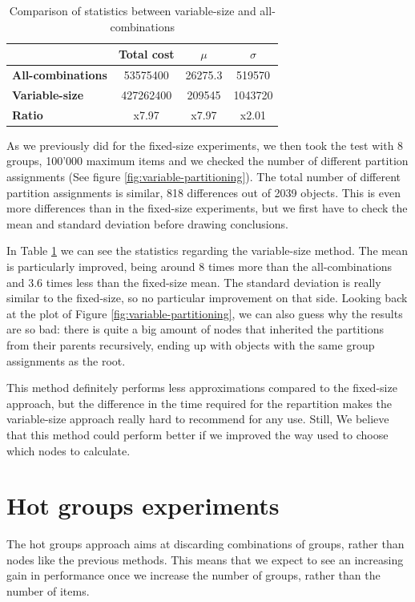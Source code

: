 \begin{table}[!htb]
  \centering
  \begin{tabular}{l c c c}
    \hline
    & \textbf{Total cost} & \textbf{$\mu$} & \textbf{$\sigma$} \\
    \hline
    \textbf{All-combinations} & 53575400 & 26275.3 & 519570\\
    \textbf{Variable-size} & 427262400 & 209545 & 1043720 \\
    \hline
    \textbf{Ratio} & x7.97 & x7.97 & x2.01 \\
    \hline
  \end{tabular}
  \caption{Comparison of statistics between variable-size and all-combinations}\label{tab:mean-stddev-variable-all}
\end{table}

As we previously did for the fixed-size experiments, we then took the test with 8 groups, 100'000 maximum items and we checked the number of different partition assignments (See figure \ref{fig:variable-partitioning}). The total number of different partition assignments is similar, 818 differences out of 2039 objects. This is even more differences than in the fixed-size experiments, but we first have to check the mean and standard deviation before drawing conclusions.

In Table \ref{tab:mean-stddev-variable-all} we can see the statistics regarding the variable-size method. The mean is particularly improved, being around 8 times more than the all-combinations and 3.6 times less than the fixed-size mean. The standard deviation is really similar to the fixed-size, so no particular improvement on that side.
Looking back at the plot of Figure \ref{fig:variable-partitioning}, we can also guess why the results are so bad: there is quite a big amount of nodes that inherited the partitions from their parents recursively, ending up with objects with the same group assignments as the root. 

This method definitely performs less approximations compared to the fixed-size approach, but the difference in the time required for the repartition makes the variable-size approach really hard to recommend for any use. Still, We believe that this method could perform better if we improved the way used to choose which nodes to calculate.

\section{Hot groups experiments}\label{sec:hot-groups-experiments}
The hot groups approach aims at discarding combinations of groups, rather than nodes like the previous methods. This means that we expect to see an increasing gain in performance once we increase the number of groups, rather than the number of items.

